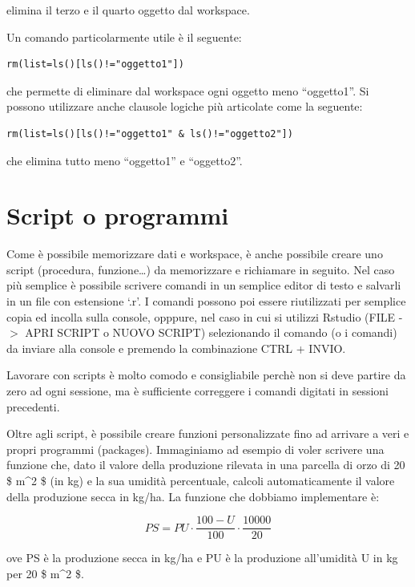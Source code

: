 \documentclass[a4paper,12pt,oneside]{book}
\begin{document}
elimina il terzo e il quarto oggetto dal workspace.

Un comando particolarmente utile è il seguente:

\begin{verbatim}
rm(list=ls()[ls()!="oggetto1"])
\end{verbatim}

che permette di eliminare dal workspace ogni oggetto meno ``oggetto1''. Si possono utilizzare anche clausole logiche più articolate come la seguente:

\begin{verbatim}
rm(list=ls()[ls()!="oggetto1" & ls()!="oggetto2"])
\end{verbatim}

che elimina tutto meno ``oggetto1'' e ``oggetto2''.

\hypertarget{script-o-programmi}{%
\section*{Script o programmi}\label{script-o-programmi}}

Come è possibile memorizzare dati e workspace, è anche possibile creare uno script (procedura, funzione\ldots) da memorizzare e richiamare in seguito. Nel caso più semplice è possibile scrivere comandi in un semplice editor di testo e salvarli in un file con estensione `.r'. I comandi possono poi essere riutilizzati per semplice copia ed incolla sulla console, opppure, nel caso in cui si utilizzi Rstudio (FILE -\(>\) APRI SCRIPT o NUOVO SCRIPT) selezionando il comando (o i comandi) da inviare alla console e premendo la combinazione CTRL + INVIO.

Lavorare con scripts è molto comodo e consigliabile perchè non si deve partire da zero ad ogni sessione, ma è sufficiente correggere i comandi digitati in sessioni precedenti.

Oltre agli script, è possibile creare funzioni personalizzate fino ad arrivare a veri e propri programmi (packages). Immaginiamo ad esempio di voler scrivere una funzione che, dato il valore della produzione rilevata in una parcella di orzo di 20 \$ m\^{}2 \$ (in kg) e la sua umidità percentuale, calcoli automaticamente il valore della
produzione secca in kg/ha. La funzione che dobbiamo implementare è:

\[
PS = PU \cdot \frac{100 - U}{100} \cdot \frac{10000}{20}
\]

ove PS è la produzione secca in kg/ha e PU è la produzione all'umidità U in kg per 20 \$ m\^{}2 \$.
\end{document}
